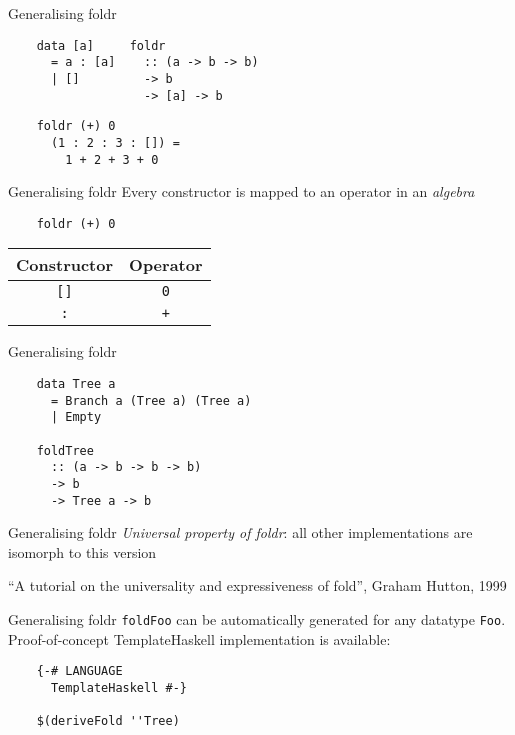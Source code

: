 \documentclass[20pt]{beamer}
\newcommand{\vspaced}{
    \vspace{5mm}
}
\begin{document}
\begin{frame}[fragile]{Generalising foldr}
    \begin{lstlisting}
    data [a]     foldr
      = a : [a]    :: (a -> b -> b)
      | []         -> b
                   -> [a] -> b
    \end{lstlisting}

    \begin{lstlisting}
    foldr (+) 0
      (1 : 2 : 3 : []) =
        1 + 2 + 3 + 0
    \end{lstlisting}
\end{frame}

\begin{frame}[fragile]{Generalising foldr}
    Every constructor is mapped to an operator in an \emph{algebra} \\
    \vspaced
    \begin{lstlisting}
    foldr (+) 0
    \end{lstlisting}
    \vspaced
    \begin{tabular}{c|c}
        \textbf{Constructor} & \textbf{Operator} \\
        \hline
        \texttt{[]}          & \texttt{0}        \\
        \texttt{:}           & \texttt{+}        \\
    \end{tabular}
\end{frame}

\begin{frame}[fragile]{Generalising foldr}
    \begin{lstlisting}
    data Tree a
      = Branch a (Tree a) (Tree a)
      | Empty

    foldTree
      :: (a -> b -> b -> b)
      -> b
      -> Tree a -> b
    \end{lstlisting}
\end{frame}

\begin{frame}{Generalising foldr}
    \emph{Universal property of foldr}: all other
    implementations are isomorph to this version \\
    \vspaced
    \small{``A tutorial on the universality and expressiveness of fold'',
    Graham Hutton, 1999}
\end{frame}

\begin{frame}[fragile]{Generalising foldr}
    \texttt{foldFoo} can be automatically generated for any datatype
    \texttt{Foo}. Proof-of-concept TemplateHaskell implementation is
    available: \\
    \vspaced
    \begin{lstlisting}
    {-# LANGUAGE
      TemplateHaskell #-}

    $(deriveFold ''Tree)
    \end{lstlisting}
\end{frame}
\end{document}
